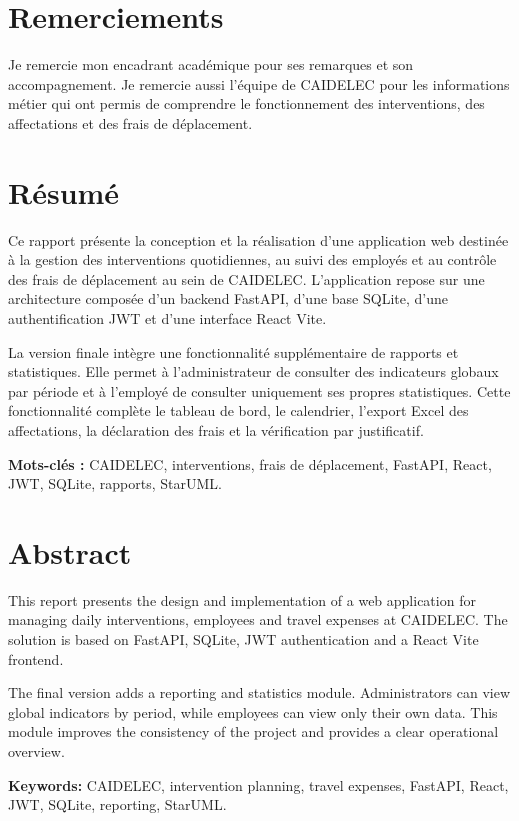 \documentclass[12pt,a4paper,oneside]{report}
\begin{document}
\chapter*{Remerciements}
Je remercie mon encadrant académique pour ses remarques et son accompagnement. Je remercie aussi l'équipe de CAIDELEC pour les informations métier qui ont permis de comprendre le fonctionnement des interventions, des affectations et des frais de déplacement.

\chapter*{Résumé}
Ce rapport présente la conception et la réalisation d'une application web destinée à la gestion des interventions quotidiennes, au suivi des employés et au contrôle des frais de déplacement au sein de CAIDELEC. L'application repose sur une architecture composée d'un backend FastAPI, d'une base SQLite, d'une authentification JWT et d'une interface React Vite.

La version finale intègre une fonctionnalité supplémentaire de rapports et statistiques. Elle permet à l'administrateur de consulter des indicateurs globaux par période et à l'employé de consulter uniquement ses propres statistiques. Cette fonctionnalité complète le tableau de bord, le calendrier, l'export Excel des affectations, la déclaration des frais et la vérification par justificatif.

\textbf{Mots-clés :} CAIDELEC, interventions, frais de déplacement, FastAPI, React, JWT, SQLite, rapports, StarUML.

\chapter*{Abstract}
This report presents the design and implementation of a web application for managing daily interventions, employees and travel expenses at CAIDELEC. The solution is based on FastAPI, SQLite, JWT authentication and a React Vite frontend.

The final version adds a reporting and statistics module. Administrators can view global indicators by period, while employees can view only their own data. This module improves the consistency of the project and provides a clear operational overview.

\textbf{Keywords:} CAIDELEC, intervention planning, travel expenses, FastAPI, React, JWT, SQLite, reporting, StarUML.
\end{document}
